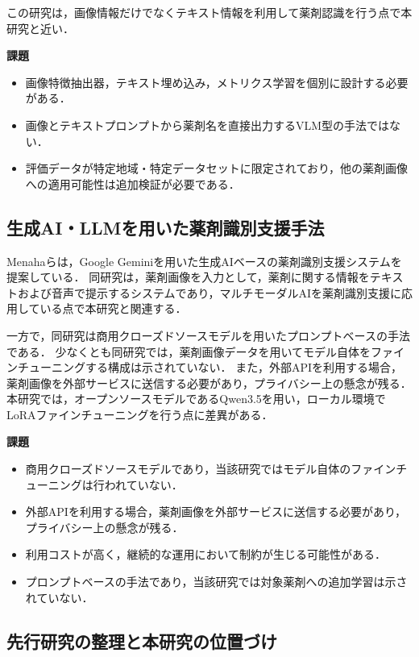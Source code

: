 \documentclass{ltjsarticle}
\begin{document}
この研究は，画像情報だけでなくテキスト情報を利用して薬剤認識を行う点で本研究と近い．

\textbf{課題}
\begin{itemize}
  \item 画像特徴抽出器，テキスト埋め込み，メトリクス学習を個別に設計する必要がある．
  \item 画像とテキストプロンプトから薬剤名を直接出力するVLM型の手法ではない．
  \item 評価データが特定地域・特定データセットに限定されており，他の薬剤画像への適用可能性は追加検証が必要である．
\end{itemize}

\subsection{生成AI・LLMを用いた薬剤識別支援手法}

Menahaら\cite{gemini2024pill}は，Google Geminiを用いた生成AIベースの薬剤識別支援システムを提案している．
同研究は，薬剤画像を入力として，薬剤に関する情報をテキストおよび音声で提示するシステムであり，マルチモーダルAIを薬剤識別支援に応用している点で本研究と関連する．

一方で，同研究は商用クローズドソースモデルを用いたプロンプトベースの手法である．
少なくとも同研究では，薬剤画像データを用いてモデル自体をファインチューニングする構成は示されていない．
また，外部APIを利用する場合，薬剤画像を外部サービスに送信する必要があり，プライバシー上の懸念が残る．
本研究では，オープンソースモデルであるQwen3.5を用い，ローカル環境でLoRAファインチューニングを行う点に差異がある．

\textbf{課題}
\begin{itemize}
  \item 商用クローズドソースモデルであり，当該研究ではモデル自体のファインチューニングは行われていない．
  \item 外部APIを利用する場合，薬剤画像を外部サービスに送信する必要があり，プライバシー上の懸念が残る．
  \item 利用コストが高く，継続的な運用において制約が生じる可能性がある．
  \item プロンプトベースの手法であり，当該研究では対象薬剤への追加学習は示されていない．
\end{itemize}

\subsection{先行研究の整理と本研究の位置づけ}
\end{document}
